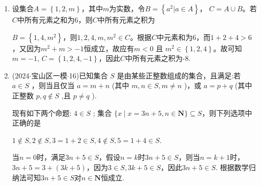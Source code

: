 \begin{enumerate}
\begin{jieda}
        由${\mathbf{a}}_{\mathbf{i}} \in  \mathbf{Z}(i = 1,2,3,4)$可知$a_2^2 \geq 0, a_3^2 \geq 1, a_4^2 \geq 4$，因此必有$a_4^2 > a_4$，故$\left\{\begin{array}{l}
                a_2^2 = a_2 \\
                a_3^2 = a_3
        \end{array}\right.$，即$\left\{\begin{array}{l}
                a_2 = 0 \\
                a_3 = 1
        \end{array}\right.$，故$A \cup  B = \left\{-1, 0, 1, a_4, a_4^2\right\}$，故$a_4 = 7$，因此$a_3+a_4 = 8$
    \end{jieda}
    \item 设集合$A=\left\{1, 2, m\right\}$，其中$m$为实数，令$B=\left\{a^2|a \in A\right\}$， $C = A \cup B$。若$C$中所有元素之和为6，则$C$中所有元素之积为
    \begin{jieda}
        $B = \left\{1, 4, m^2\right\}$，则$1, 2, 4, m, m^2 \in C$。根据$C$中元素和为6，而$1+2+4 > 6$，又因为$m^2+m > -1$恒成立，故应有$m < 0$ 且 $m^2 \in \left\{1, 2, 4\right\}$。故可知$m = -1$, $C = \left\{1, 2, 4, -1\right\}$，因此$C$中所有元素之积为-8.
    \end{jieda}

    \item (2024$\cdot$宝山区一模$\cdot$16)已知集合 $S$ 是由某些正整数组成的集合，且满足:若 $a \in  S$ ，则当且仅当 $a = m + n$ (其中 $m,n \in  S,m \neq  n$ )，或 $a = p + q$ (其中正整数 $p,q \notin  S$ ,且 $p \neq  q$ ).
    
    现有如下两个命题:   $4 \in  S$ ;    集合 $\{ x \mid  x = {3n} + 5,n \in  \mathbf{N}\}  \subseteq  S$，则下列选项中正确的是 
    \begin{jieda}
        $1 \notin S, 2 \notin S, 3=1+2 \in S, 4 \notin S, 5 = 1+4 \in S$.

        当$n = 0$时，满足${3n} + 5 \in S$，假设$n = k$时${3n} + 5 \in S$，则当$n = k+1$时，${3n} + 5 = 3 + (3k+5)$，因为$3 \in S, 3k+5 \in S$，因此${3n} + 5 \in S$. 根据数学归纳法可知${3n} + 5 \in S$对$n \in \mathbf{N}$恒成立.
    \end{jieda}
\end{enumerate}

